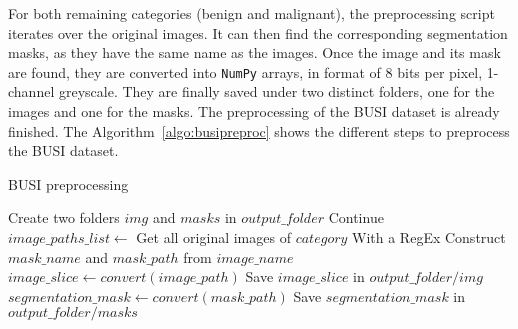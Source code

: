 For both remaining categories (benign and malignant), the preprocessing script iterates over the original images. It can then find the corresponding segmentation masks, as they have the same name as the images. Once the image and its mask are found, they are converted into \texttt{NumPy} arrays, in format of 8 bits per pixel, 1-channel greyscale. They are finally saved under two distinct folders, one for the images and one for the masks. The preprocessing of the BUSI dataset is already finished. The Algorithm~\ref{algo:busipreproc} shows the different steps to preprocess the BUSI dataset.

\begin{algorithm}[t!]
  \caption{BUSI preprocessing}
  \label{algo:busipreproc}
  \begin{algorithmic}[1]
    \State Create two folders $img$ and $masks$ in $output\_folder$
        \State Continue
      \EndIf
      \State $image\_paths\_list \gets$ Get all original images of $category$
         \Comment With a RegEx
          \State Construct $mask\_name$ and $mask\_path$ from $image\_name$
          \State $image\_slice \gets convert(image\_path)$
          \State Save $image\_slice$ in $output\_folder/img$
          \State $segmentation\_mask \gets convert(mask\_path)$
          \State Save $segmentation\_mask$ in $output\_folder/masks$
        \EndIf
      \EndFor
    \EndFor
  \end{algorithmic}
\end{algorithm}


